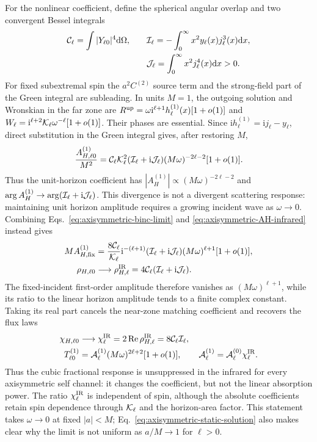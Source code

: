\documentclass[aps,prd,twocolumn,10pt,nofootinbib,superscriptaddress,floatfix]{revtex4-2}
\newcommand{\dd}{\mathrm{d}}
\newcommand{\ii}{\mathrm{i}}
\begin{document}
For the nonlinear coefficient, define the spherical angular overlap and two
convergent Bessel integrals
\begin{align}
 {\cal C}_\ell=\int|Y_{\ell0}|^4\dd\Omega,
 \qquad &
 {\cal I}_\ell=-\int_0^\infty x^2y_\ell(x)j_\ell^3(x)\dd x ,\nonumber\\
 &{\cal J}_\ell=\int_0^\infty x^2j_\ell^4(x)\dd x>0.
 \label{eq:axisymmetric-infrared-integral}
\end{align}
For fixed subextremal spin the $a^2C^{(2)}$ source term and the strong-field
part of the Green integral are subleading.  In units $M=1$, the outgoing
solution and Wronskian in the far zone are
$R^{\rm up}=\omega\ii^{\ell+1}h_\ell^{(1)}(x)[1+o(1)]$ and
$W_\ell=\ii^{\ell+2}{\cal K}_\ell\omega^{-\ell}[1+o(1)]$.
Their phases are essential.  Since
$\ii h_\ell^{(1)}=\ii j_\ell-y_\ell$, direct substitution in the Green
integral gives, after restoring $M$,
\begin{equation}
 \frac{A_{H,\ell0}^{(1)}}{M^2}
 ={\cal C}_\ell{\cal K}_\ell^2
 ({\cal I}_\ell+\ii{\cal J}_\ell)
 (M\omega)^{-2\ell-2}[1+o(1)].
 \label{eq:axisymmetric-AH-infrared}
\end{equation}
Thus the unit-horizon coefficient has
$|A_H^{(1)}|\propto(M\omega)^{-2\ell-2}$ and
$\arg A_H^{(1)}\to\arg({\cal I}_\ell+\ii{\cal J}_\ell)$.  This divergence is
not a divergent scattering response: maintaining unit horizon amplitude
requires a growing incident wave as $\omega\to0$.  Combining
Eqs.~\eqref{eq:axisymmetric-binc-limit} and
\eqref{eq:axisymmetric-AH-infrared} instead gives
\begin{align}
 M A_{H,{\rm fix}}^{(1)}
 &=\frac{8{\cal C}_\ell}{{\cal K}_\ell}\ii^{-(\ell+1)}
 ({\cal I}_\ell+\ii{\cal J}_\ell)
 (M\omega)^{\ell+1}[1+o(1)],\nonumber\\
 \rho_{H,\ell0}
 &\longrightarrow\rho^{\rm IR}_{H,\ell}
 =4{\cal C}_\ell({\cal I}_\ell+\ii{\cal J}_\ell).
 \label{eq:axisymmetric-complex-response}
\end{align}
The fixed-incident first-order amplitude therefore vanishes as
$(M\omega)^{\ell+1}$, while its ratio to the linear horizon amplitude tends
to a finite complex constant.  Taking its real part cancels the near-zone
matching coefficient and recovers the flux laws
\begin{align}
 \chi_{H,\ell0}
 &\longrightarrow \chi^{\rm IR}_\ell
 =2\operatorname{Re}\rho^{\rm IR}_{H,\ell}
 =8{\cal C}_\ell{\cal I}_\ell,\nonumber\\
 T^{(1)}_{\ell0}
 &={\cal A}^{(1)}_\ell(M\omega)^{2\ell+2}[1+o(1)],
 \qquad
 {\cal A}^{(1)}_\ell={\cal A}^{(0)}_\ell\chi^{\rm IR}_\ell .
 \label{eq:axisymmetric-T1-infrared}
\end{align}
Thus the cubic fractional response is unsuppressed in the infrared for
every axisymmetric self channel: it changes the coefficient, but not the linear absorption
power.  The ratio $\chi^{\rm IR}_\ell$ is independent of spin, although the
absolute coefficients retain spin dependence through ${\cal K}_\ell$ and the
horizon-area factor.  This statement takes $\omega\to0$ at fixed $|a|<M$;
Eq.~\eqref{eq:axisymmetric-static-solution} also makes clear why the limit is
not uniform as $a/M\to1$ for $\ell>0$.
\end{document}
